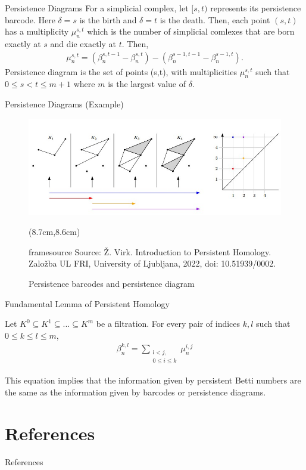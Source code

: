 \documentclass{beamer}
\newcommand{\source}[1]{\begin{textblock*}{4cm}(8.7cm,8.6cm)
    \begin{beamercolorbox}[ht=0.5cm,right]{framesource}
        \usebeamerfont{framesource}\usebeamercolor[fg]{framesource} Source: {#1}
    \end{beamercolorbox}
\end{textblock*}}
\begin{document}
\begin{frame}{Persistence Diagrams}
    For a simplicial complex, let $[s,t)$ represents its persistence barcode. Here $\delta=s$ is the birth and $\delta=t$ is the death. Then, each point $(s,t)$  has a \textcolor{myred}{multiplicity $\mu_{n}^{s,t}$} which is the number of simplicial comlexes that are born exactly at $s$ and die exactly at $t$. Then,
    \begin{align*}
        \mu_{n}^{s,t}=(\beta_{n}^{s,t-1}-\beta_{n}^{s,t})-(\beta_{n}^{s-1,t-1}-\beta_{n}^{s-1,t}).
    \end{align*}
    \textcolor{myred}{Persistence diagram} is the set of points (s,t), with multiplicities $\mu_{n}^{s,t}$ such that $0 \leq s < t \leq m+1$ where $m$ is the largest value of $\delta$.
\end{frame}

\begin{frame}{Persistence Diagrams (Example)}
    \begin{figure}
        \includegraphics[scale=0.55]{./diagram.jpg}
        \source{Ž. Virk. Introduction to Persistent Homology. Založba UL FRI, University of Ljubljana, 2022, doi: 10.51939/0002. }
        \caption{Persistence barcodes and persistence diagram}
    \end{figure}
\end{frame}

\begin{frame}{Fundamental Lemma of Persistent Homology}
    \begin{lemma} 
        Let $K^0 \subseteq K^1 \subseteq ... \subseteq K^m$ be a filtration. For every pair of indices $k,l$ such that $0 \leq k \leq l\leq m$, 
        \begin{align*}
            \beta_{n}^{k,l} = \sum\limits_{\substack{l < j, \\0 \leq i \leq k}}\mu_{n}^{i,j}
        \end{align*}
    \end{lemma}
    This equation implies that the information given by persistent Betti numbers are the same as the information given by barcodes or persistence diagrams.\cite{virk}
\end{frame}

\section{References}
\begin{frame}{References}
    \printbibliography
\end{frame}  
\end{document}
